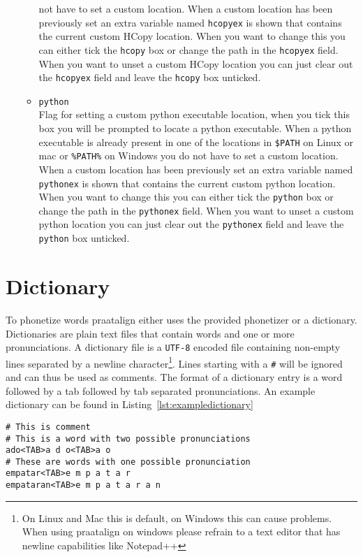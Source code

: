\begin{itemize}
\begin{itemize}
				not have to set a custom location. When a custom location has been
				previously set an extra variable named \texttt{hcopyex} is shown that
				contains the current custom HCopy location. When you want to change
				this you can either tick the \texttt{hcopy} box or change the path in
				the \texttt{hcopyex} field. When you want to unset a custom HCopy
				location you can just clear out the \texttt{hcopyex} field and leave
				the \texttt{hcopy} box unticked.
			\item \texttt{python}\\
				Flag for setting a custom python executable location, when you tick
				this box you will be prompted to locate a python executable. When a
				python executable is already present in one of the locations in
				\texttt{\$PATH} on Linux or mac or \texttt{\%PATH\%} on Windows you do
				not have to set a custom location. When a custom location has been
				previously set an extra variable named \texttt{pythonex} is shown that
				contains the current custom python location. When you want to change
				this you can either tick the \texttt{python} box or change the path in
				the \texttt{pythonex} field. When you want to unset a custom python
				location you can just clear out the \texttt{pythonex} field and leave
				the \texttt{python} box unticked.
		\end{itemize}
\end{itemize}

\section{Dictionary}
To phonetize words praatalign either uses the provided phonetizer or a
dictionary. Dictionaries are plain text files that contain words and one or
more pronunciations. A dictionary file is a \texttt{UTF-8} encoded file
containing non-empty lines separated by a newline
character\footnote{\label{fn:n1}On Linux and Mac this is default, on Windows
this can cause problems. When using praatalign on windows please refrain to a
text editor that has newline capabilities like Notepad++}. Lines starting with
a \texttt{\#} will be ignored and can thus be used as comments. The format of a
dictionary entry is a word followed by a tab followed by tab separated
pronunciations. An example dictionary can be found in
Listing~\ref{lst:exampledictionary}

\begin{lstlisting}[caption={Example dictionary},label={lst:exampledictionary}]
# This is comment
# This is a word with two possible pronunciations
ado<TAB>a d o<TAB>a o
# These are words with one possible pronunciation
empatar<TAB>e m p a t a r
empataran<TAB>e m p a t a r a n
\end{lstlisting}
	

